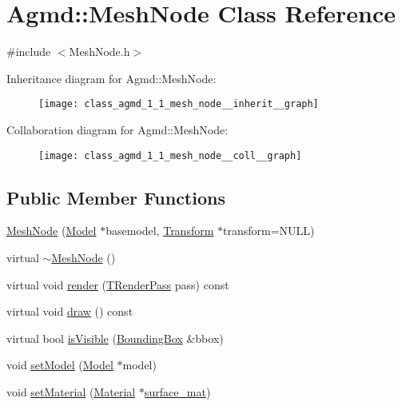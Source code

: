 \hypertarget{class_agmd_1_1_mesh_node}{\section{Agmd\+:\+:Mesh\+Node Class Reference}
\label{class_agmd_1_1_mesh_node}
}


{\ttfamily \#include $<$Mesh\+Node.\+h$>$}



Inheritance diagram for Agmd\+:\+:Mesh\+Node\+:\nopagebreak
\begin{figure}[H]
\begin{center}
\leavevmode
\texttt{[image: class\_agmd\_1\_1\_mesh\_node\_\_inherit\_\_graph]}
\end{center}
\end{figure}


Collaboration diagram for Agmd\+:\+:Mesh\+Node\+:\nopagebreak
\begin{figure}[H]
\begin{center}
\leavevmode
\texttt{[image: class\_agmd\_1\_1\_mesh\_node\_\_coll\_\_graph]}
\end{center}
\end{figure}
\subsection*{Public Member Functions}
\begin{DoxyCompactItemize}
\item 
\hyperlink{class_agmd_1_1_mesh_node_a3fe4461842909318d97330caf3f711f1}{Mesh\+Node} (\hyperlink{class_agmd_1_1_model}{Model} $\ast$basemodel, \hyperlink{class_agmd_maths_1_1_transform}{Transform} $\ast$transform=N\+U\+L\+L)
\item 
virtual \hyperlink{class_agmd_1_1_mesh_node_aa0d4cfbb37610bab4aa7fe3f787be73e}{$\sim$\+Mesh\+Node} ()
\item 
virtual void \hyperlink{class_agmd_1_1_mesh_node_a4152144e5d07304bb44001a5e97571a5}{render} (\hyperlink{namespace_agmd_a893087981df53d0bf39466e9039aeb73}{T\+Render\+Pass} pass) const 
\item 
virtual void \hyperlink{class_agmd_1_1_mesh_node_a8b905212c90d73b820531b36ea9bb0a9}{draw} () const 
\item 
virtual bool \hyperlink{class_agmd_1_1_mesh_node_afdb179841c3cd851b2288a48dfb691f8}{is\+Visible} (\hyperlink{class_agmd_1_1_bounding_box}{Bounding\+Box} \&bbox)
\item 
void \hyperlink{class_agmd_1_1_mesh_node_a8de6dd045d3cd0d257921351545cdd65}{set\+Model} (\hyperlink{class_agmd_1_1_model}{Model} $\ast$model)
\item 
void \hyperlink{class_agmd_1_1_mesh_node_a82fb33982608eac2d8da479a70ea888d}{set\+Material} (\hyperlink{class_agmd_1_1_material}{Material} $\ast$\hyperlink{_examples_2_bezier_2_app_8cpp_a63e99cfa720724b1887a463ec6abd935}{surface\+\_\+mat})
\end{DoxyCompactItemize}
